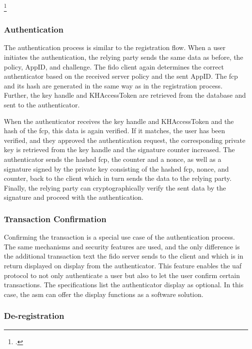 \footcites[See][191]{7897543}[See][131]{10.1007/978-3-319-67639-5_11}[See][]{uaf-asm}

\subsubsection{Authentication}

The authentication process is similar to the registration flow. When a user initiates the authentication, the relying party sends the same data as before, the policy, AppID, and challenge. The \gls{fido} client again determines the correct authenticator based on the received server policy and the sent AppID. The \gls{fcp} and its hash are generated in the same way as in the registration process. Further, the key handle and KHAccessToken are retrieved from the database and sent to the authenticator.

When the authenticator receives the key handle and KHAccessToken and the hash of the \gls{fcp}, this data is again verified. If it matches, the user has been verified, and they approved the authentication request, the corresponding private key is retrieved from the key handle and the signature counter increased. The authenticator sends the hashed \gls{fcp}, the counter and a \gls{nonce}, as well as a signature signed by the private key consisting of the hashed \gls{fcp}, nonce, and counter, back to the client which in turn sends the data to the relying party. Finally, the relying party can cryptographically verify the sent data by the signature and proceed with the authentication.

\subsubsection{Transaction Confirmation}

Confirming the transaction is a special use case of the authentication process. The same mechanisms and security features are used, and the only difference is the additional transaction text the \gls{fido} server sends to the client and which is in return displayed on display from the authenticator. This feature enables the \gls{uaf} protocol to not only authenticate a user but also to let the user confirm certain transactions. The specifications list the authenticator display as optional. In this case, the \gls{asm} can offer the display functions as a software solution.

\subsubsection{De-registration}

